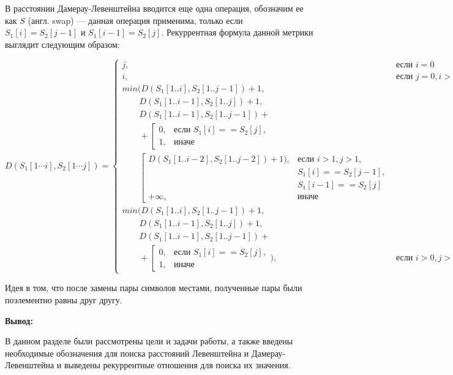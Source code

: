 В расстоянии Дамерау-Левенштейна вводится еще одна операция, обозначим ее как $S$ (англ. swap) --- данная операция применима, только  если $S_{1}[i] = S_{2}[j - 1]$
и $S_{1}[i - 1] = S_{2}[j]$. Рекуррентная формула  данной метрики выглядит следующим образом:
\begin{tiny}
\begin{equation}
	\label{eq:DL}
	D(S_{1}[1\cdots i],S_{2}[1 \cdots j]) = \left\{ \begin{array}{ll}
		j, & \textrm{$\mbox{если }i = 0$}\\
		i, & \textrm{$\mbox{если }j = 0, i > 1$}\\ 
		min(D(S_{1}[1..i], S_{2}[1.. j - 1]) + 1,\\
		\qquad D(S_{1}[1..i - 1], S_{2}[1..j]) + 1,\\
		\qquad D(S_{1}[1..i - 1], S_{2}[1..j - 1]) + \\
		\qquad+\left[ 
		\begin{array}{ccc}
			0, & \textrm{$\mbox{если }S_{1}[i] == S_{2}[j],$}\\
			1, & \textrm{иначе}
		\end{array} 
		\right.\\
		\qquad \left[
		\begin{array}{ccc}
			D(S_{1}[1..i - 2], S_{2}[1..j - 2]) + 1), & \textrm{$\mbox{если }i > 1, j > 1,$}\\
			& \textrm{$S_{1}[i] == S_{2}[j - 1],$}\\
			& \textrm{$S_{1}[i - 1] == S_{2}[j]$}\\
			+{\infty}, & \textrm{иначе}
		\end{array}
	\right.\\
		
		min(D(S_{1}[1..i], S_{2}[1..j - 1]) + 1,\\
		\qquad D(S_{1}[1..i - 1], S_{2}[1..j]) + 1, \\
		\qquad D(S_{1}[1..i - 1], S_{2}[1..j - 1]) + \\
		\qquad+\left[ 
		\begin{array}{ccc}
			0, & \textrm{$\mbox{если }S_{1}[i] == S_{2}[j],$}\\
			1, & \textrm{иначе}
		\end{array} 
		\right.), &\textrm{$\mbox{если }i>0, j>0$}
	\end{array} \right.
\end{equation}
\end{tiny}
Идея в том, что после замены пары символов местами, полученные пары были поэлементно равны друг другу.

\textbf{Вывод:}

В данном разделе были рассмотрены цели и задачи работы, а также введены необходимые обозначения для поиска расстояний Левенштейна и Дамерау-Левенштейна
и выведены рекуррентные отношения для поиска их значения.

